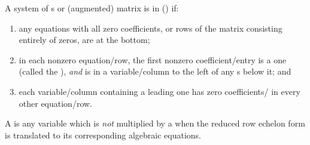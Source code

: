 \begin{definition} \label{def:rref} 
 A system of s or (augmented) matrix is in  (\rref) if:
  \begin{enumerate}
\item any equations with all zero coefficients, or rows of the matrix consisting entirely of zeros, are at the bottom; 
\item in each nonzero equation\slash row, the first nonzero coefficient\slash entry is a one (called the ), \emph{and} is in a variable\slash column to the left of any s below it;
and
\item each variable\slash column containing a leading one has zero coefficients\slash {} in every other equation\slash row.\end{enumerate}
A  is any variable which is \emph{not} multiplied by a  when the reduced row echelon form is translated to its corresponding algebraic equations.
\end{definition}


